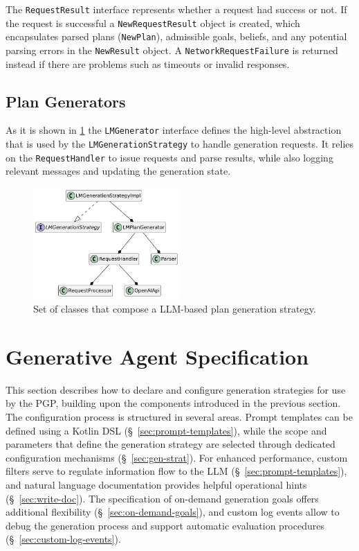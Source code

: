 \documentclass[12pt,a4paper,openright,twoside]{book}
\begin{document}
The \texttt{RequestResult} interface represents whether a request had success or not.
%
If the request is successful a \texttt{NewRequestResult} object is created, which encapsulates parsed plans (\texttt{NewPlan}), admissible goals, beliefs, and any potential parsing errors in the \texttt{NewResult} object. 
%
A \texttt{NetworkRequestFailure} is returned instead if there are problems such as timeouts or invalid responses.

\subsection{Plan Generators}\label{sec:plan-generators}

As it is shown in \cref{fig:gen-strat} the \texttt{LMGenerator} interface defines the high-level abstraction that is used by the \texttt{LMGenerationStrategy} to handle generation requests. 
%
It relies on the \texttt{RequestHandler} to issue requests and parse results, while also logging relevant messages and updating the generation state.

\begin{figure}
    \centering
    \includegraphics[width=0.5\textwidth]{figures/gen-strat.pdf}
    \caption{Set of classes that compose a LLM-based plan generation strategy.}
    \label{fig:gen-strat}
\end{figure}

\section{Generative Agent Specification}\label{sec:generative-agent-spec}

This section describes how to declare and configure generation strategies for use by the PGP, building upon the components introduced in the previous section.
%
The configuration process is structured in several areas.
%
Prompt templates can be defined using a Kotlin \ac{DSL} (\S~\ref{sec:prompt-templates}), while the scope and parameters that define the generation strategy are selected through dedicated configuration mechanisms (\S~\ref{sec:gen-strat}).
%
For enhanced performance, custom filters serve to regulate information flow to the LLM (\S~\ref{sec:prompt-templates}), and natural language documentation provides helpful operational hints (\S~\ref{sec:write-doc}).
%
The specification of on-demand generation goals offers additional flexibility (\S~\ref{sec:on-demand-goals}), and custom log events allow to debug the generation process and support automatic evaluation procedures (\S~\ref{sec:custom-log-events}).
\end{document}
